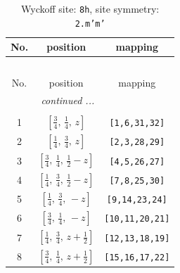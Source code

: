 \documentclass[fleqn,8pt]{jsarticle}
\begin{document}
\begin{longtable}{ccc}
\caption{Wyckoff site: {\tt 8h}, site symmetry: {\tt 2.m'm'}}
 \\
 \hline \hline
No. & position & mapping \\ \hline \endfirsthead

\multicolumn{2}{l}{\tablename\ \thetable{}} \\
 \hline \hline
No. & position & mapping \\ \hline \endhead

 \hline \hline
\multicolumn{2}{r}{\footnotesize\it continued ...} \\ \endfoot

 \hline \hline
\multicolumn{2}{r}{} \\ \endlastfoot

1 & $\left[ \frac{3}{4},\, \frac{1}{4},\, z \right]$ & {\tt [1,6,31,32]} \\ \hline
2 & $\left[ \frac{1}{4},\, \frac{3}{4},\, z \right]$ & {\tt [2,3,28,29]} \\ \hline
3 & $\left[ \frac{3}{4},\, \frac{1}{4},\, \frac{1}{2} - z \right]$ & {\tt [4,5,26,27]} \\ \hline
4 & $\left[ \frac{1}{4},\, \frac{3}{4},\, \frac{1}{2} - z \right]$ & {\tt [7,8,25,30]} \\ \hline
5 & $\left[ \frac{1}{4},\, \frac{3}{4},\, - z \right]$ & {\tt [9,14,23,24]} \\ \hline
6 & $\left[ \frac{3}{4},\, \frac{1}{4},\, - z \right]$ & {\tt [10,11,20,21]} \\ \hline
7 & $\left[ \frac{1}{4},\, \frac{3}{4},\, z + \frac{1}{2} \right]$ & {\tt [12,13,18,19]} \\ \hline
8 & $\left[ \frac{3}{4},\, \frac{1}{4},\, z + \frac{1}{2} \right]$ & {\tt [15,16,17,22]} \\
\end{longtable}
\renewcommand{\arraystretch}{1.2}
\end{document}
